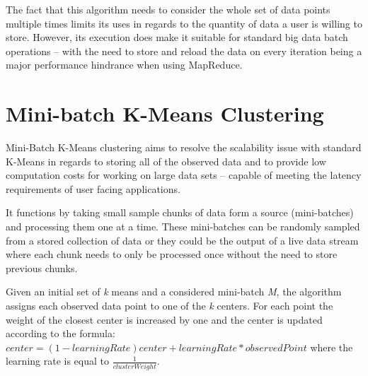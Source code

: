 \documentclass{l4proj}
\begin{document}
The fact that this algorithm needs to consider the whole set of data points multiple times limits its uses in regards to the quantity of data a user is willing to store. However, its execution does make it suitable for standard big data batch operations -- with the need to store and reload the data on every iteration being a major performance hindrance when using MapReduce.

\section{Mini-batch K-Means Clustering}

Mini-Batch K-Means clustering\cite{Mini} aims to resolve the scalability issue with standard K-Means in regards to storing all of the observed data and to provide low computation costs for working on large data sets -- capable of meeting the latency requirements of user facing applications.

It functions by taking small sample chunks of data form a source (mini-batches) and processing them one at a time. These mini-batches can be randomly sampled from a stored collection of data or they could be the output of a live data stream where each chunk needs to only be processed once without the need to store previous chunks.

Given an initial set of \textit{k} means and a considered mini-batch \textit{M}, the algorithm assigns each observed data point to one of the \textit{k} centers. For each point the weight of the closest center is increased by one and the center is updated according to the formula: $center = (1 - learningRate)center + learningRate * observedPoint$ where the learning rate is equal to $\frac{1}{clusterWeight}$.
\end{document}
